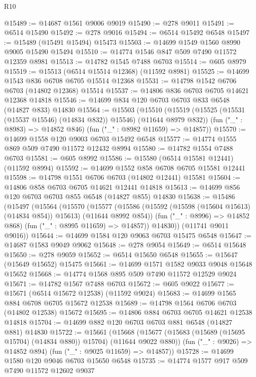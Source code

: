 \begin{lexlean}{R10}
\begin{coremodule}
@15489 := @14687 @1561 @9006 @9019
@15490 := @278 @9011
@15491 := @6514 @15490
@15492 := @278 @9016
@15494 := @6514 @15492 @6548
@15497 := @15489 (@15491 @15494) @15473
@15503 := @14699 @1549 @1560 @8990 @9005 @15490 @15494
@15510 := @14774 @1546 @847 @509 @7490 @11572 @12359 @8981
@15513 := @14782 @1545 @7488 @6703
@15514 := @605 @8979
@15519 := @15513 (@6514 @15514 @12368) (@11592 @8981)
@15525 := @14699 @1543 @836 @6708 @6705 @15514 @12368
@15531 := @14798 @1542 @6706 @6703 (@14802 @12368) @15514
@15537 := @14806 @836 @6703 @6705 @14621 @12368 @14818
@15546 := @14699 @834 @120 @6703 @6703 @833 @6548 (@14827 @833) @14830
@15564 := @15503
    (@15510
      (@15519 (@15525 (@15531 (@15537 @15546) (@14834 @832)) @15546) (@11644 @8979 @832))
      (fun ("_" : @8983) => @14852 @846)
      (fun ("_" : @8982 @11659) => @14857))
@15570 := @14699 @1558 @120 @9003 @6703 @15492 @6548
@15577 := @14774 @1555 @869 @509 @7490 @11572 @12432 @8994
@15580 := @14782 @1554 @7488 @6703
@15581 := @605 @8992
@15586 := @15580 (@6514 @15581 @12441) (@11592 @8994)
@15592 := @14699 @1552 @858 @6708 @6705 @15581 @12441
@15598 := @14798 @1551 @6706 @6703 (@14802 @12441) @15581
@15604 := @14806 @858 @6703 @6705 @14621 @12441 @14818
@15613 := @14699 @856 @120 @6703 @6703 @855 @6548 (@14827 @855) @14830
@15638 := @15486
    (@15497
      (@15564
        (@15570
          (@15577
            (@15586 (@15592 (@15598 (@15604 @15613) (@14834 @854)) @15613) (@11644 @8992 @854))
            (fun ("_" : @8996) => @14852 @868)
            (fun ("_" : @8995 @11659) => @14857))
          @14830))
      (@11741 @9011 @9016))
@15644 := @14699 @1584 @120 @9063 @6703 @15475 @6548
@15647 := @14687 @1583 @9049 @9062
@15648 := @278 @9054
@15649 := @6514 @15648
@15650 := @278 @9059
@15652 := @6514 @15650 @6548
@15655 := @15647 (@15649 @15652) @15475
@15661 := @14699 @1571 @1582 @9033 @9048 @15648 @15652
@15668 := @14774 @1568 @895 @509 @7490 @11572 @12529 @9024
@15671 := @14782 @1567 @7488 @6703
@15672 := @605 @9022
@15677 := @15671 (@6514 @15672 @12538) (@11592 @9024)
@15683 := @14699 @1565 @884 @6708 @6705 @15672 @12538
@15689 := @14798 @1564 @6706 @6703 (@14802 @12538) @15672
@15695 := @14806 @884 @6703 @6705 @14621 @12538 @14818
@15704 := @14699 @882 @120 @6703 @6703 @881 @6548 (@14827 @881) @14830
@15722 := @15661
    (@15668
      (@15677 (@15683 (@15689 (@15695 @15704) (@14834 @880)) @15704) (@11644 @9022 @880))
      (fun ("_" : @9026) => @14852 @894)
      (fun ("_" : @9025 @11659) => @14857))
@15728 := @14699 @1580 @120 @9046 @6703 @15650 @6548
@15735 := @14774 @1577 @917 @509 @7490 @11572 @12602 @9037

\end{coremodule}
\end{lexlean}
